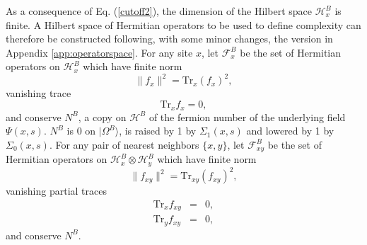 \documentclass[12pt,amsmath,amssymb,onecolumn]{revtex4-2}
\begin{document}
As a consequence of Eq. (\ref{cutoff2}), the dimension of
the Hilbert space $\mathcal{H}^B_x$ is finite.
A Hilbert space of Hermitian operators to be used to
define complexity can therefore be constructed following,
with some minor changes, the version
in Appendix \ref{app:operatorspace}.
For any site $x$, let $\mathcal{F}^B_x$ be the set of Hermitian operators on
$\mathcal{H}^B_x$ which have finite norm
\begin{equation}
  \label{normfxx}
  \parallel f_x \parallel ^ 2 = \mathrm{Tr}_x( f_x)^2,
\end{equation}
vanishing trace 
\begin{equation}
  \label{trx0x}
  \mathrm{Tr}_x f_x  = 0,
\end{equation}
and conserve $N^B$, a copy on $\mathcal{H}^B$ of the 
fermion number of the underlying field $\Psi(x, s)$.
$N^B$ is 0 on $|\Omega^B \rangle $, is raised by 1 
by $\Sigma_1( x, s)$ and lowered by
1 by $\Sigma_0( x, s)$.
For any pair of nearest neighbors $\{x,y\}$,
let $\mathcal{F}^B_{xy}$ be the
set of Hermitian operators on $\mathcal{H}^B_x \otimes \mathcal{H}^B_y$
which have finite norm 
\begin{equation}
  \label{normfxyx}
  \parallel f_{xy} \parallel ^ 2 = \mathrm{Tr}_{xy}( f_{xy})^2,
\end{equation}
vanishing partial traces 
\begin{subequations}
\begin{eqnarray}
  \label{trx1x}
  \mathrm{Tr}_x f_{xy}  &=& 0, \\
  \label{try1x}
  \mathrm{Tr}_y f_{xy}  &=& 0,
\end{eqnarray}
\end{subequations}
and conserve $N^B$.
\end{document}
